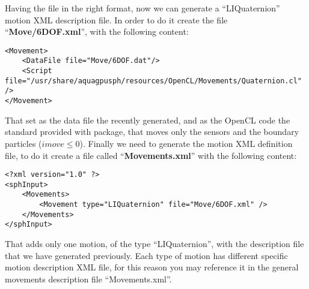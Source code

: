 %
Having the file in the right format, now we can generate a ``LIQuaternion'' motion XML description file. In order
to do it create the file ``\textbf{Move/6DOF.xml}'', with the following content:
%
\begin{verbatim}
<Movement>
	<DataFile file="Move/6DOF.dat"/>
	<Script file="/usr/share/aquagpusph/resources/OpenCL/Movements/Quaternion.cl" />
</Movement>
\end{verbatim}
%
That set as the data file the recently generated, and as the OpenCL code the standard provided with \NAME package,
that moves only the sensors and the boundary particles ($imove \le 0$).\rc
%
Finally we need to generate the motion XML definition file, to do it create a file called ``\textbf{Movements.xml}''
with the following content:
%
\begin{verbatim}
<?xml version="1.0" ?>
<sphInput>
	<Movements>
		<Movement type="LIQuaternion" file="Move/6DOF.xml" />
	</Movements>
</sphInput>
\end{verbatim}
%
That adds only one motion, of the type ``LIQuaternion'', with the description file that we have generated
previously.\rc
%
Each type of motion has different specific motion description XML file, for this reason you may reference it in
the general movements description file ``Movements.xml''.
%
